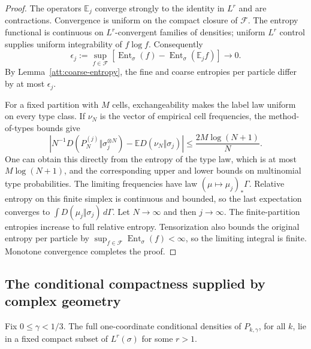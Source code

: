 \begin{proof}
The operators $\mathbb E_j$ converge strongly to the identity in
$L^r$ and are contractions. Convergence is uniform on the compact
closure of $\mathcal F$. The entropy functional is continuous on
$L^r$-convergent families of densities; uniform $L^r$ control supplies
uniform integrability of $f\log f$. Consequently
\[
 \epsilon_j:=\sup_{f\in\mathcal F}
 [\operatorname{Ent}_\sigma(f)-
       \operatorname{Ent}_\sigma(\mathbb E_jf)]\longrightarrow0.
\]
By Lemma~\ref{att:coarse-entropy}, the fine and coarse entropies per
particle differ by at most $\epsilon_j$.

For a fixed partition with $M$ cells, exchangeability makes the label
law uniform on every type class. If $\nu_N$ is the vector of empirical
cell frequencies, the method-of-types bounds give
\[
 \left|N^{-1}D(P_N^{(j)}\Vert\sigma_j^{\otimes N})
               -\mathbb E D(\nu_N\Vert\sigma_j)\right|
 \le \frac{2M\log(N+1)}N.
\]
One can obtain this directly from the entropy of the type law, which
is at most $M\log(N+1)$, and the corresponding upper and lower bounds
on multinomial type probabilities. The limiting frequencies have law
$(\mu\mapsto\mu_j)_*\Gamma$. Relative entropy on this finite simplex
is continuous and bounded, so the last expectation converges to
$\int D(\mu_j\Vert\sigma_j)\,d\Gamma$.
Let $N\to\infty$ and then $j\to\infty$. The finite-partition
entropies increase to full relative entropy. Tensorization also
bounds the original entropy per particle by
$\sup_{f\in\mathcal F}\operatorname{Ent}_\sigma(f)<\infty$,
so the limiting integral is finite. Monotone convergence completes
the proof.
\end{proof}

\subsection{The conditional compactness supplied by complex geometry}

\begin{lemma}
\label{att:conditional-compactness}
Fix $0\le\gamma<1/3$. The full one-coordinate conditional densities
of $P_{k,\gamma}$, for all $k$, lie in a fixed compact subset of
$L^r(\sigma)$ for some $r>1$.
\end{lemma}

